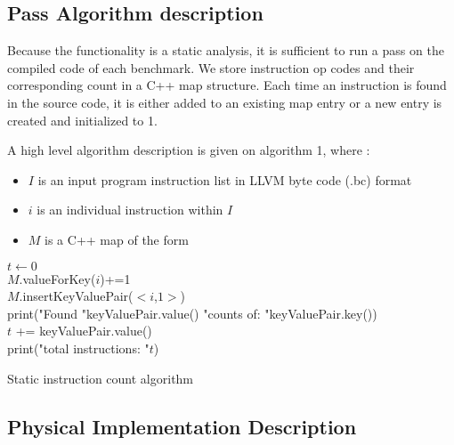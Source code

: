 \subsection{Pass Algorithm description}

Because the functionality is a static analysis, it is sufficient to run a pass on the compiled code of each benchmark.
We store instruction op codes and their corresponding count in a C++ map structure. Each time an instruction is found in the source code, it is either added to an existing map entry or a new entry is created and initialized to 1.

A high level algorithm description is given on algorithm 1, where :
\begin{itemize}
\item {$I$ is an input program instruction list in LLVM byte code (.bc) format}
\item{$i$ is an individual instruction within $I$}
\item{$M$ is a C++ map of the form }
\end{itemize}

\begin{algorithm}
 $t \gets 0$\\
 { 
 	{
 		$M$.valueForKey($i$)+=1\\
 	}
 	\Else
 	{
 		$M$.insertKeyValuePair($<i$,$1>$)\\
 	}
 }
 {
 	print("Found "keyValuePair.value() "counts of: "keyValuePair.key())\\
 	$t$ += keyValuePair.value()\\
 }
 print("total instructions: "$t$)
 \caption{Static instruction count algorithm}
\end{algorithm}

\subsection{Physical Implementation Description}

